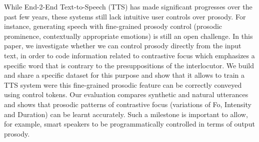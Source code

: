 While End-2-End Text-to-Speech (TTS) has made significant progresses over the past few years, these systems still lack intuitive user controls over prosody. For instance, generating speech with fine-grained prosody control (prosodic prominence, contextually appropriate emotions) is still an open challenge. In this paper, we investigate whether we can control prosody directly from the input text, in order to code information related to contrastive focus which emphasizes a specific word that is contrary to the presuppositions of the interlocutor. We build and share a specific dataset for this purpose and show that it allows to train a TTS system were this fine-grained prosodic feature can be correctly conveyed using control tokens. Our evaluation compares synthetic and natural utterances and shows that prosodic patterns of contrastive focus (variations of Fo, Intensity and Duration) can be learnt accurately. Such a milestone is important to allow, for example, smart speakers to be programmatically controlled in terms of output prosody.
